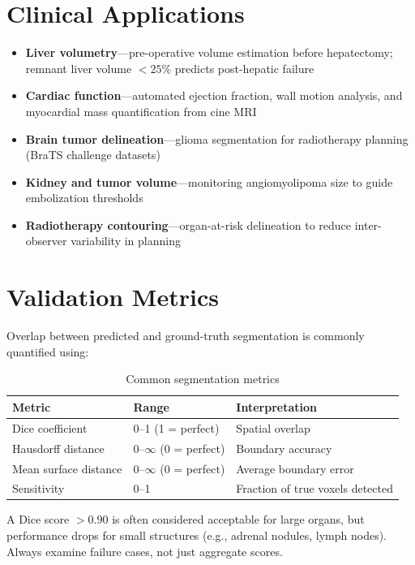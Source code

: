 \section{Clinical Applications}
\begin{itemize}
    \item \textbf{Liver volumetry}---pre-operative volume estimation before hepatectomy; remnant liver volume $<25\%$ predicts post-hepatic failure
    \item \textbf{Cardiac function}---automated ejection fraction, wall motion analysis, and myocardial mass quantification from cine MRI
    \item \textbf{Brain tumor delineation}---glioma segmentation for radiotherapy planning (BraTS challenge datasets)
    \item \textbf{Kidney and tumor volume}---monitoring angiomyolipoma size to guide embolization thresholds
    \item \textbf{Radiotherapy contouring}---organ-at-risk delineation to reduce inter-observer variability in planning
\end{itemize}

\section{Validation Metrics}
Overlap between predicted and ground-truth segmentation is commonly quantified using:
\begin{table}[h]
\centering
\caption{Common segmentation metrics}
\begin{tabular}{|p{}|p{}|p{}|}
\hline
\textbf{Metric} & \textbf{Range} & \textbf{Interpretation} \\
\hline
Dice coefficient & 0--1 (1 = perfect) & Spatial overlap \\
\hline
Hausdorff distance & 0--$\infty$ (0 = perfect) & Boundary accuracy \\
\hline
Mean surface distance & 0--$\infty$ (0 = perfect) & Average boundary error \\
\hline
Sensitivity & 0--1 & Fraction of true voxels detected \\
\hline
\end{tabular}
\end{table}

A Dice score $>0.90$ is often considered acceptable for large organs, but performance drops for small structures (e.g., adrenal nodules, lymph nodes). Always examine failure cases, not just aggregate scores.

